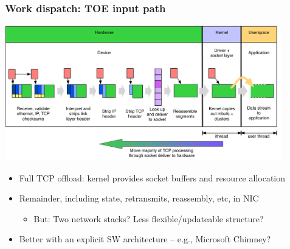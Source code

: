 \begin{frame}
  \frametitle{Work dispatch: TOE input path}

  \begin{center}
    \includegraphics[width=0.9\textwidth]{../../figures/network-dispatch-toe.pdf}
  \end{center}

  \begin{small}
  \begin{itemize}
    \item Full TCP offload: kernel provides socket buffers and resource
       allocation
    \item Remainder, including state, retransmits, reassembly, etc, in NIC
    \begin{itemize}
      \item But: Two network stacks?  Less flexible/updateable structure?
    \end{itemize}
    \item Better with an explicit SW architecture -- e.g., Microsoft Chimney?
  \end{itemize}
  \end{small}
\end{frame}

%

%
%

